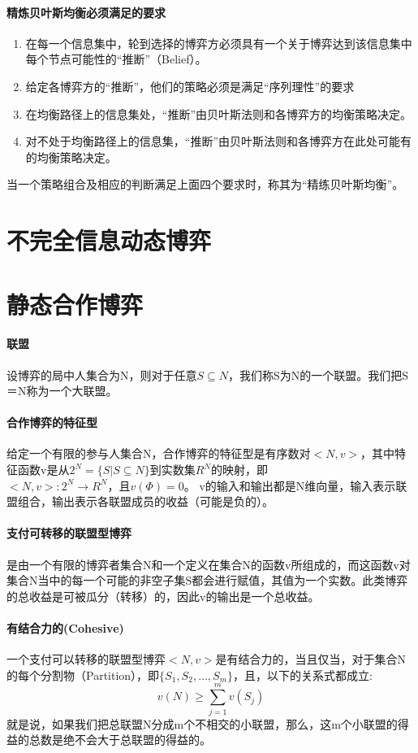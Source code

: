 \documentclass[12pt,a4paper]{article}
\begin{document}
\paragraph{精炼贝叶斯均衡必须满足的要求}
\begin{enumerate}
	\item 在每一个信息集中，轮到选择的博弈方必须具有一个关于博弈达到该信息集中每个节点可能性的“推断”（Belief）。
	\item 给定各博弈方的“推断”，他们的策略必须是满足“序列理性”的要求
	\item 在均衡路径上的信息集处，“推断”由贝叶斯法则和各博弈方的均衡策略决定。
	\item 对不处于均衡路径上的信息集，“推断”由贝叶斯法则和各博弈方在此处可能有的均衡策略决定。
\end{enumerate}
当一个策略组合及相应的判断满足上面四个要求时，称其为“精练贝叶斯均衡”。

\newpage
\section{不完全信息动态博弈}

\newpage
\section{静态合作博弈}
\paragraph{联盟} 设博弈的局中人集合为N，则对于任意$S \subseteq N$，我们称S为N的一个联盟。我们把S＝N称为一个大联盟。
\paragraph{合作博弈的特征型} 给定一个有限的参与人集合N，合作博弈的特征型是有序数对$ <N,v> $，其中特征函数v是从$2^N= \{ S|S \subseteq N\}$到实数集$R^N$的映射，即$<N,v>:2^N \rightarrow R^N，且v(\Phi)=0$。
v的输入和输出都是N维向量，输入表示联盟组合，输出表示各联盟成员的收益（可能是负的）。

\paragraph{支付可转移的联盟型博弈} 是由一个有限的博弈者集合N和一个定义在集合N的函数v所组成的，而这函数v对集合N当中的每一个可能的非空子集S都会进行赋值，其值为一个实数。此类博弈的总收益是可被瓜分（转移）的，因此v的输出是一个总收益。
\paragraph{有结合力的(Cohesive)} 一个支付可以转移的联盟型博弈$<N,v>$是有结合力的，当且仅当，对于集合N的每个分割物（Partition），即$\{S_1,S_2,…,S_m \}$，且，以下的关系式都成立:
\begin{equation}
	v(N) \geq \sum_{j=1}^m v(S_j)
\end{equation}
就是说，如果我们把总联盟N分成m个不相交的小联盟，那么，这m个小联盟的得益的总数是绝不会大于总联盟的得益的。
\end{document}
